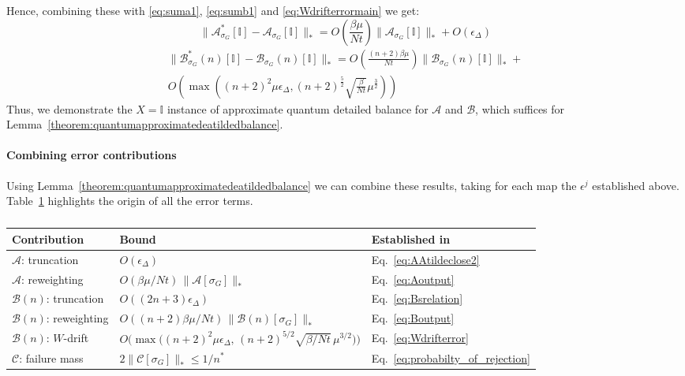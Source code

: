 Hence, combining these with \eqref{eq:suma1}, \eqref{eq:sumb1} and \eqref{eq:Wdrifterrormain} we get:
\begin{equation}
    \|\mathcal{A}^*_{\sigma_G}[\mathbb{I}] - \mathcal{A}_{\sigma_G}[\mathbb{I}]\|_* = O\!\left(\frac{\beta\mu}{Nt}\right)\|\mathcal{A}_{\sigma_G}[\mathbb{I}]\|_* + O\!\left(\epsilon_{\Delta}\right)
\end{equation}
\begin{multline}
    \|\mathcal{B}^*_{\sigma_G}(n)[\mathbb{I}] - \mathcal{B}_{\sigma_G}(n)[\mathbb{I}]\|_* = O\left(\frac{(n+2)\beta\mu}{Nt} \right)\|\mathcal{B}_{\sigma_G}(n)[\mathbb{I}]\|_* +\\O\left(\max\left((n+2)^2\mu\epsilon_{\Delta},(n+2)^{\frac{5}{2}}\sqrt{\frac{\beta }{Nt}}\mu^{\frac{3}{2}}\right)\right) 
\end{multline}
Thus, we demonstrate the $X=\mathbb{I}$ instance of approximate quantum detailed balance for $\mathcal{A}$ and $\mathcal{B}$, which suffices for Lemma~\ref{theorem:quantumapproximatedeatildedbalance}.
\paragraph{Combining error contributions}
\label{sec:combine}
Using Lemma~\ref{theorem:quantumapproximatedeatildedbalance} we can combine these results, taking for each map the $\epsilon^j$ established above. Table~\ref{tab:contributions} highlights the origin of all the error terms.
\begin{table}[htbp]
\centering
\setlength{\tabcolsep}{6pt}
\renewcommand{\arraystretch}{1.3}
\begin{tabular}{@{}lll@{}}
\toprule
Contribution & Bound & Established in \\
\midrule
$\mathcal{A}$: truncation & $O(\epsilon_{\Delta})$ & Eq.~\eqref{eq:AAtildeclose2} \\
$\mathcal{A}$: reweighting & $O(\beta\mu/Nt)\,\|\mathcal{A}[\sigma_G]\|_*$ & Eq.~\eqref{eq:Aoutput} \\
$\mathcal{B}(n)$: truncation & $O((2n+3)\epsilon_{\Delta})$ & Eq.~\eqref{eq:Bsrelation} \\
$\mathcal{B}(n)$: reweighting & $O((n+2)\beta\mu/Nt)\,\|\mathcal{B}(n)[\sigma_G]\|_*$ & Eq.~\eqref{eq:Boutput} \\
$\mathcal{B}(n)$: $W$-drift & $O\big(\max\big((n+2)^2\mu\epsilon_{\Delta},\,(n+2)^{5/2}\sqrt{\beta/Nt}\,\mu^{3/2}\big)\big)$ & Eq.~\eqref{eq:Wdrifterror} \\
$\mathcal{C}$: failure mass & $2\|\mathcal{C}[\sigma_G]\|_* \leq 1/n^*$ & Eq.~\eqref{eq:probabilty_of_rejection} \\
\bottomrule
\end{tabular}
\caption{\label{tab:contributions} }
\end{table}


